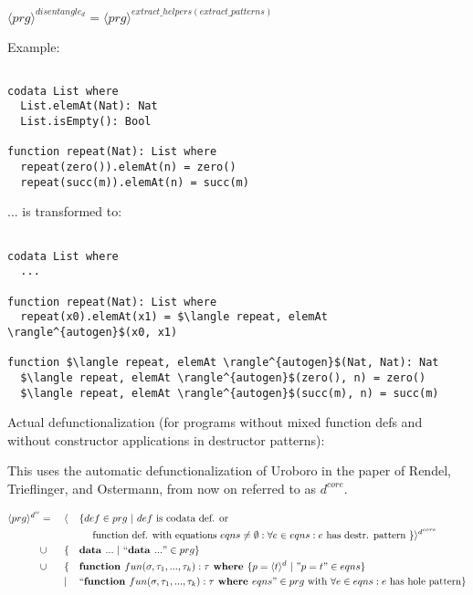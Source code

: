 \documentclass[11pt]{article} %
\begin{document}
$\langle prg \rangle^{disentangle_d} = \langle prg \rangle^{extract\_helpers(extract\_patterns)}$

Example:

\begin{lstlisting}

codata List where
  List.elemAt(Nat): Nat
  List.isEmpty(): Bool

function repeat(Nat): List where
  repeat(zero()).elemAt(n) = zero()
  repeat(succ(m)).elemAt(n) = succ(m)

\end{lstlisting}

... is transformed to:

\begin{lstlisting}[mathescape]

codata List where
  ...

function repeat(Nat): List where
  repeat(x0).elemAt(x1) = $\langle repeat, elemAt \rangle^{autogen}$(x0, x1)

function $\langle repeat, elemAt \rangle^{autogen}$(Nat, Nat): Nat
  $\langle repeat, elemAt \rangle^{autogen}$(zero(), n) = zero()
  $\langle repeat, elemAt \rangle^{autogen}$(succ(m), n) = succ(m)

\end{lstlisting}

Actual defunctionalization (for programs without mixed function defs and without constructor applications in destructor patterns):

This uses the automatic defunctionalization of Uroboro in the paper of Rendel, Trieflinger, and Ostermann, from now on referred to as $d^{core}$.

\begin{alignat*}{3}
\langle prg \rangle^{d''} & = ~&& \langle && \{ def \in prg ~ | ~ def \textrm{ is codata def. or} \\ & && &&\quad \textrm{ function def. with equations } eqns \neq \emptyset: \forall e \in eqns: e \textrm{ has destr. pattern } \} \rangle^{d^{core}} \\
& \cup && \{ && \textrm{\textbf{data }} ... ~ | ~ `` \textrm{\textbf{data }} ... " \in prg \} \\
& \cup && \{ && \textrm{\textbf{function }} fun(\sigma, \tau_1, ..., \tau_k): \tau \textrm{\textbf{ where }} \{ p = \langle t \rangle^d ~ | ~ "p = t" \in eqns \} \\
& && | && `` \textrm{\textbf{function }} fun(\sigma, \tau_1, ..., \tau_k): \tau \textrm{\textbf{ where }} eqns " \in prg \textrm{ with } \forall e \in eqns: e \textrm{ has hole pattern}\} 
\end{alignat*}
\end{document}
